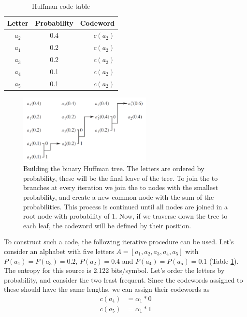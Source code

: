 \documentclass{diploma_style}
\begin{document}
\begin{table}
\caption{Huffman code table}
\centering
\begin{tabular}{ccr}
\toprule
Letter & Probability & Codeword \\
\midrule
$a_2$ & 0.4 & $c(a_2)$ \\
$a_1$ & 0.2 & $c(a_2)$ \\
$a_3$ & 0.2 & $c(a_2)$ \\
$a_4$ & 0.1 & $c(a_2)$ \\
$a_5$ & 0.1 & $c(a_2)$ \\
\bottomrule
\end{tabular}
\label{tab:huffman1}
\end{table}

\begin{figure}
\centering
\includegraphics[width=0.6\textwidth]{figures/3_compression/huffman}
\caption{Building the binary Huffman tree. The letters are ordered by probability, these will be the final leave of the tree. To join the to branches at every iteration we join the to nodes with the smallest probability, and create a new common node with the sum of the probabilities. This process is continued until all nodes are joined in a root node with probability of 1. Now, if we traverse down the tree to each leaf, the codeword will be defined by their position. }
\label{fig:huffman}
\end{figure}

To construct such a code, the following iterative procedure can be used. Let's consider an alphabet with five letters $A = [a_1,a_2,a_3,a_4,a_5]$ with $P(a_1)=P(a_3)=0.2$, $P(a_2)=0.4$ and $P(a_4)=P(a_5)=0.1$ (Table \ref{tab:huffman1}). The entropy for this source is 2.122 bits/symbol. Let's order the letters by probability, and consider the two least frequent. Since the codewords assigned to these should have the same lengths, we can assign their codewords as
\begin{align*}
c(a_4) &= \alpha_1 * 0 \\
c(a_5) &= \alpha_1 *1
\end{align*}
\end{document}
